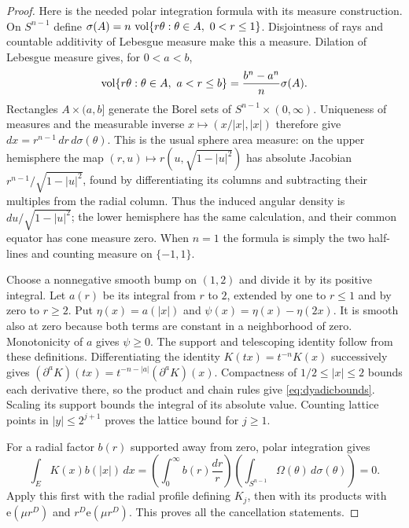 \documentclass[11pt,oneside]{article}
\theoremstyle{definition}\newtheorem{definition}[theorem]{Definition}
\theoremstyle{remark}\newtheorem{remark}[theorem]{Remark}
\newcommand{\ee}[1]{\mathrm e\!\left(#1\right)}
\begin{document}
\begin{proof}
Here is the needed polar integration formula with its measure construction.
On $S^{n-1}$ define
$\sigma(A)=n\,\operatorname{vol}\{r\theta:\theta\in A,\ 0<r\leq1\}$.
Disjointness of rays and countable additivity of Lebesgue measure make this
a measure. Dilation of Lebesgue measure gives, for $0<a<b$,
\[
 \operatorname{vol}\{r\theta:\theta\in A,\ a<r\leq b\}
     =\frac{b^n-a^n}{n}\sigma(A).
\]
Rectangles $A\times(a,b]$ generate the Borel sets of
$S^{n-1}\times(0,\infty)$. Uniqueness of measures and the measurable inverse
$x\mapsto(x/|x|,|x|)$ therefore give
$dx=r^{n-1}\,dr\,d\sigma(\theta)$. This is the usual sphere area measure:
on the upper hemisphere the map
$(r,u)\mapsto r(u,\sqrt{1-|u|^2})$ has absolute Jacobian
$r^{n-1}/\sqrt{1-|u|^2}$, found by differentiating its columns and subtracting
their multiples from the radial column. Thus the induced angular density is
$du/\sqrt{1-|u|^2}$; the lower hemisphere has the same calculation, and their
common equator has cone measure zero. When $n=1$ the formula is simply the
two half-lines and counting measure on $\{-1,1\}$.

Choose a nonnegative smooth bump on $(1,2)$ and divide it by its positive
integral. Let $a(r)$ be its integral from $r$ to $2$, extended by one to
$r\leq1$ and by zero to $r\geq2$. Put $\eta(x)=a(|x|)$ and
$\psi(x)=\eta(x)-\eta(2x)$. It is smooth also at zero because both terms are
constant in a neighborhood of zero. Monotonicity of $a$ gives $\psi\geq0$.
The support and telescoping identity follow from these definitions.
Differentiating the identity $K(tx)=t^{-n}K(x)$ successively gives
$(\partial^aK)(tx)=t^{-n-|a|}(\partial^aK)(x)$. Compactness of
$1/2\leq|x|\leq2$ bounds each derivative there, so the product and chain rules
give \eqref{eq:dyadicbounds}. Scaling its support bounds the integral of its
absolute value. Counting lattice points in $|y|\leq2^{j+1}$ proves the lattice
bound for $j\geq1$.

For a radial factor $b(r)$ supported away from zero, polar integration gives
\[
 \int_E K(x)b(|x|)\,dx
 =\left(\int_0^\infty b(r)\frac{dr}{r}\right)
    \left(\int_{S^{n-1}}\Omega(\theta)\,d\sigma(\theta)\right)=0.
\]
Apply this first with the radial profile defining $K_j$, then with its
products with $\ee{\mu r^D}$ and $r^D\ee{\mu r^D}$. This proves all the
cancellation statements.
\end{proof}
\end{document}
